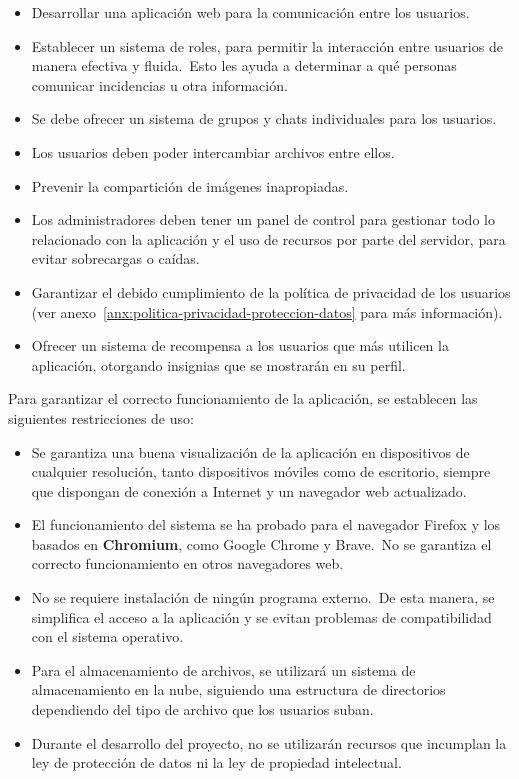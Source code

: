\begin{itemize}
	\item Desarrollar una aplicación web para la comunicación entre los usuarios.
	\item Establecer un sistema de roles, para permitir la interacción entre usuarios de manera
	efectiva y fluida.\ Esto les ayuda a determinar a qué personas comunicar incidencias u otra
	información.
	\item Se debe ofrecer un sistema de grupos y chats individuales para los usuarios.
	\item Los usuarios deben poder intercambiar archivos entre ellos.
	\item Prevenir la compartición de imágenes inapropiadas.
	\item Los administradores deben tener un panel de control para gestionar todo lo relacionado con la aplicación
	y el uso de recursos por parte del servidor, para evitar sobrecargas o caídas.
	\item Garantizar el debido cumplimiento de la política de privacidad de los usuarios
	(ver anexo~\ref{anx:politica-privacidad-proteccion-datos} para más información).
	\item Ofrecer un sistema de recompensa a los usuarios que más utilicen la aplicación, otorgando insignias
	que se mostrarán en su perfil.
\end{itemize}
\label{itm:alcance_objetivos}


Para garantizar el correcto funcionamiento de la aplicación, se establecen las siguientes restricciones de uso:

\begin{itemize}
	\item Se garantiza una buena visualización de la aplicación en dispositivos de cualquier resolución, tanto
	dispositivos móviles como de escritorio, siempre que dispongan de conexión a Internet y un navegador web
	actualizado.
	\item El funcionamiento del sistema se ha probado para el navegador Firefox y los basados en \textbf{Chromium},
	como Google Chrome y Brave.\ No se garantiza el correcto funcionamiento en otros navegadores web.
	\item No se requiere instalación de ningún programa externo.\ De esta manera, se
	simplifica el acceso a la aplicación y se evitan problemas de compatibilidad con el sistema operativo.
	\item Para el almacenamiento de archivos, se utilizará un sistema de almacenamiento en la nube, siguiendo
	una estructura de directorios dependiendo del tipo de archivo que los usuarios suban.
	\item Durante el desarrollo del proyecto, no se utilizarán recursos que incumplan la ley de protección de
	datos ni la ley de propiedad intelectual.
\end{itemize}
\label{itm:alcance_limitaciones}

